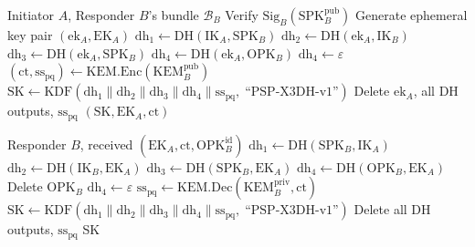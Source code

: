 \documentclass[11pt,a4paper]{article}
\begin{document}
\begin{algorithm}[H]
\caption{PSP Extended X3DH (Initiator Side)}
\label{alg:x3dh-init}
\begin{algorithmic}[1]
\Require Initiator $A$, Responder $B$'s bundle $\mathcal{B}_B$
\State Verify $\mathrm{Sig}_B(\mathrm{SPK}_B^{\mathrm{pub}})$
\State Generate ephemeral key pair $(\mathrm{ek}_A, \mathrm{EK}_A)$
\State {}
\State $\mathrm{dh}_1 \gets \mathrm{DH}(\mathrm{IK}_A, \mathrm{SPK}_B)$
\State $\mathrm{dh}_2 \gets \mathrm{DH}(\mathrm{ek}_A, \mathrm{IK}_B)$
\State $\mathrm{dh}_3 \gets \mathrm{DH}(\mathrm{ek}_A, \mathrm{SPK}_B)$
    \State $\mathrm{dh}_4 \gets \mathrm{DH}(\mathrm{ek}_A, \mathrm{OPK}_B)$
\Else
    \State $\mathrm{dh}_4 \gets \varepsilon$
\EndIf
\State {}
\State $(\mathrm{ct}, \mathrm{ss}_{\mathrm{pq}}) \gets
    \mathrm{KEM.Enc}(\mathrm{KEM}_B^{\mathrm{pub}})$
\State {}
\State $\mathrm{SK} \gets \mathrm{KDF}(
    \mathrm{dh}_1 \| \mathrm{dh}_2 \| \mathrm{dh}_3 \|
    \mathrm{dh}_4 \| \mathrm{ss}_{\mathrm{pq}},\;
    \text{``PSP-X3DH-v1''})$
\State Delete $\mathrm{ek}_A$, all DH outputs, $\mathrm{ss}_{\mathrm{pq}}$
\State \Return $(\mathrm{SK}, \mathrm{EK}_A, \mathrm{ct})$
\end{algorithmic}
\end{algorithm}

\begin{algorithm}[H]
\caption{PSP Extended X3DH (Responder Side)}
\label{alg:x3dh-resp}
\begin{algorithmic}[1]
\Require Responder $B$, received $(\mathrm{EK}_A, \mathrm{ct},
    \mathrm{OPK}_B^{\mathrm{id}})$
\State $\mathrm{dh}_1 \gets \mathrm{DH}(\mathrm{SPK}_B, \mathrm{IK}_A)$
\State $\mathrm{dh}_2 \gets \mathrm{DH}(\mathrm{IK}_B, \mathrm{EK}_A)$
\State $\mathrm{dh}_3 \gets \mathrm{DH}(\mathrm{SPK}_B, \mathrm{EK}_A)$
    \State $\mathrm{dh}_4 \gets \mathrm{DH}(\mathrm{OPK}_B, \mathrm{EK}_A)$
    \State Delete $\mathrm{OPK}_B$
\Else
    \State $\mathrm{dh}_4 \gets \varepsilon$
\EndIf
\State $\mathrm{ss}_{\mathrm{pq}} \gets
    \mathrm{KEM.Dec}(\mathrm{KEM}_B^{\mathrm{priv}}, \mathrm{ct})$
\State $\mathrm{SK} \gets \mathrm{KDF}(
    \mathrm{dh}_1 \| \mathrm{dh}_2 \| \mathrm{dh}_3 \|
    \mathrm{dh}_4 \| \mathrm{ss}_{\mathrm{pq}},\;
    \text{``PSP-X3DH-v1''})$
\State Delete all DH outputs, $\mathrm{ss}_{\mathrm{pq}}$
\State \Return SK
\end{algorithmic}
\end{algorithm}
\end{document}
